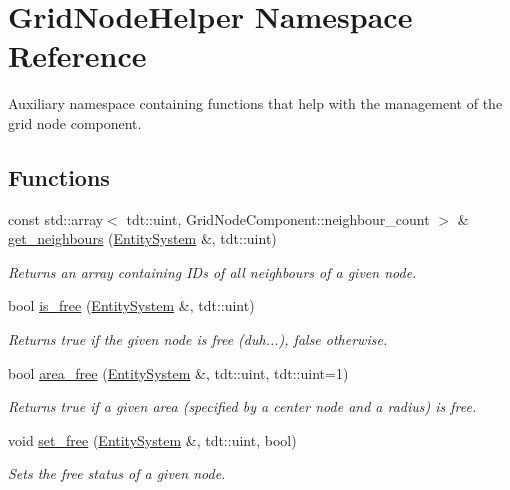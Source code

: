 \hypertarget{namespace_grid_node_helper}{}\section{Grid\+Node\+Helper Namespace Reference}
\label{namespace_grid_node_helper}


Auxiliary namespace containing functions that help with the management of the grid node component.  


\subsection*{Functions}
\begin{DoxyCompactItemize}
\item 
const std\+::array$<$ tdt\+::uint, Grid\+Node\+Component\+::neighbour\+\_\+count $>$ \& \hyperlink{namespace_grid_node_helper_ac714eee6830b9d2dc6b55789b893877f}{get\+\_\+neighbours} (\hyperlink{class_entity_system}{Entity\+System} \&, tdt\+::uint)
\begin{DoxyCompactList}\small\item\em Returns an array containing I\+Ds of all neighbours of a given node. \end{DoxyCompactList}\item 
bool \hyperlink{namespace_grid_node_helper_ab64d037379fcb1f93b5bf3e0ba1f76a0}{is\+\_\+free} (\hyperlink{class_entity_system}{Entity\+System} \&, tdt\+::uint)
\begin{DoxyCompactList}\small\item\em Returns true if the given node is free (duh...), false otherwise. \end{DoxyCompactList}\item 
bool \hyperlink{namespace_grid_node_helper_acc44e5fdb0ab2c698766b64602181904}{area\+\_\+free} (\hyperlink{class_entity_system}{Entity\+System} \&, tdt\+::uint, tdt\+::uint=1)
\begin{DoxyCompactList}\small\item\em Returns true if a given area (specified by a center node and a radius) is free. \end{DoxyCompactList}\item 
void \hyperlink{namespace_grid_node_helper_a1386a023e1fb1035589754a9da510b8f}{set\+\_\+free} (\hyperlink{class_entity_system}{Entity\+System} \&, tdt\+::uint, bool)
\begin{DoxyCompactList}\small\item\em Sets the free status of a given node. \end{DoxyCompactList}\item 

\end{DoxyCompactItemize}
